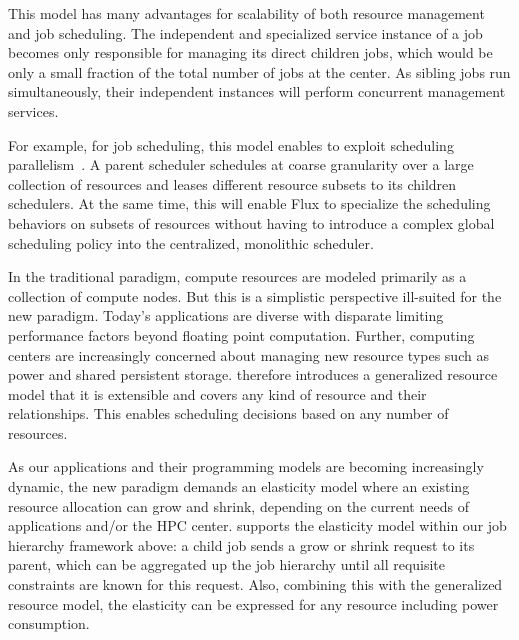 This model has many advantages for scalability of both
resource management and job scheduling. 
The independent and specialized \flux service instance
of a job becomes only responsible for managing its direct
children jobs, which would be only a small fraction of
the total number of jobs at the center. 
As sibling jobs run simultaneously, their independent
\flux instances will perform concurrent management services.

For example, for job scheduling, this model enables \flux
to exploit scheduling parallelism~\cite{Omega,Mesos}.
A parent scheduler schedules at coarse granularity 
over a large collection of resources and leases different resource subsets 
to its children schedulers. 
At the same time, this will enable Flux to specialize the scheduling behaviors 
on subsets of resources without having to introduce a
complex global scheduling policy into the centralized, monolithic scheduler. 


 In the traditional 
paradigm, compute resources are modeled primarily 
as a collection of compute nodes. But this is a simplistic perspective 
ill-suited for the new paradigm. Today's applications 
are diverse with disparate limiting performance factors 
beyond floating point computation. 
Further, computing centers are increasingly concerned 
about managing new resource types such as power 
and shared persistent storage. \flux therefore introduces a generalized resource
model that it is extensible and covers any kind of resource and their relationships. This enables scheduling
decisions based on any number of resources.


 As our 
applications and their programming models are becoming 
increasingly dynamic, the new paradigm demands 
an elasticity model where an existing resource allocation 
can grow and shrink, depending on the current needs 
of applications and/or the HPC center. 
\flux supports the elasticity model within our job hierarchy 
framework above: a child job sends a grow or shrink request 
to its parent, which can be aggregated up the job hierarchy 
until all requisite constraints are known for this request. 
Also, combining this with the generalized resource model, 
the elasticity can be expressed for any resource including 
power consumption. 

